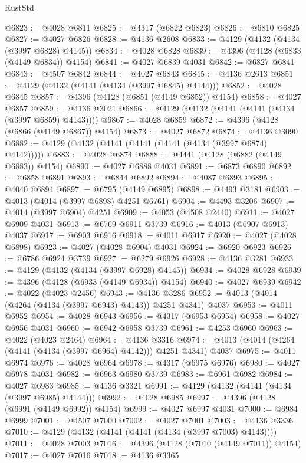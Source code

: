 \begin{lexlean}{RustStd}
\begin{coremodule}
@6823 := @4028 @6811
@6825 := @4317 (@6822 @6823)
@6826 := @6810 @6825
@6827 := @4027 @6826
@6828 := @4136 @2608
@6833 := @4129 (@4132 (@4134 (@3997 @6828) @4145))
@6834 := @4028 @6828
@6839 := @4396 (@4128 (@6833 (@4149 @6834)) @4154)
@6841 := @4027 @6839 @4031
@6842 := @6827 @6841
@6843 := @4507 @6842
@6844 := @4027 @6843
@6845 := @4136 @2613
@6851 := @4129 (@4132 (@4141 (@4134 (@3997 @6845) @4144)))
@6852 := @4028 @6845
@6857 := @4396 (@4128 (@6851 (@4149 @6852)) @4154)
@6858 := @4027 @6857
@6859 := @4136 @3021
@6866 := @4129 (@4132 (@4141 (@4141 (@4134 (@3997 @6859) @4143))))
@6867 := @4028 @6859
@6872 := @4396 (@4128 (@6866 (@4149 @6867)) @4154)
@6873 := @4027 @6872
@6874 := @4136 @3090
@6882 := @4129 (@4132 (@4141 (@4141 (@4141 (@4134 (@3997 @6874) @4142)))))
@6883 := @4028 @6874
@6888 := @4441 (@4128 (@6882 (@4149 @6883)) @4154)
@6890 := @4027 @6888 @4031
@6891 := @6873 @6890
@6892 := @6858 @6891
@6893 := @6844 @6892
@6894 := @4087 @6893
@6895 := @4040 @6894
@6897 := @6795 (@4149 @6895)
@6898 := @4493 @3181
@6903 := @4013 (@4014 (@3997 @6898) @4251 @6761)
@6904 := @4493 @3206
@6907 := @4014 (@3997 @6904) @4251
@6909 := @4053 (@4508 @2440)
@6911 := @4027 @6909 @4031
@6913 := @6769 @6911 @3739
@6916 := @4013 (@6907 @6913) @4037
@6917 := @6903 @6916
@6918 := @4011 @6917
@6920 := @4027 (@4028 @6898)
@6923 := @4027 (@4028 @6904) @4031
@6924 := @6920 @6923
@6926 := @6786 @6924 @3739
@6927 := @6279 @6926
@6928 := @4136 @3281
@6933 := @4129 (@4132 (@4134 (@3997 @6928) @4145))
@6934 := @4028 @6928
@6939 := @4396 (@4128 (@6933 (@4149 @6934)) @4154)
@6940 := @4027 @6939
@6942 := @4022 (@4023 @2456)
@6943 := @4136 @3286
@6952 := @4013 (@4014 (@4264 (@4134 (@3997 @6943) @4143)) @4251 @4341) @4037
@6953 := @4011 @6952
@6954 := @4028 @6943
@6956 := @4317 (@6953 @6954)
@6958 := @4027 @6956 @4031
@6960 := @6942 @6958 @3739
@6961 := @4253 @6960
@6963 := @4022 (@4023 @2464)
@6964 := @4136 @3316
@6974 := @4013 (@4014 (@4264 (@4141 (@4134 (@3997 @6964) @4142))) @4251 @4341) @4037
@6975 := @4011 @6974
@6976 := @4028 @6964
@6978 := @4317 (@6975 @6976)
@6980 := @4027 @6978 @4031
@6982 := @6963 @6980 @3739
@6983 := @6961 @6982
@6984 := @4027 @6983
@6985 := @4136 @3321
@6991 := @4129 (@4132 (@4141 (@4134 (@3997 @6985) @4144)))
@6992 := @4028 @6985
@6997 := @4396 (@4128 (@6991 (@4149 @6992)) @4154)
@6999 := @4027 @6997 @4031
@7000 := @6984 @6999
@7001 := @4507 @7000
@7002 := @4027 @7001
@7003 := @4136 @3336
@7010 := @4129 (@4132 (@4141 (@4141 (@4134 (@3997 @7003) @4143))))
@7011 := @4028 @7003
@7016 := @4396 (@4128 (@7010 (@4149 @7011)) @4154)
@7017 := @4027 @7016
@7018 := @4136 @3365

\end{coremodule}
\end{lexlean}
